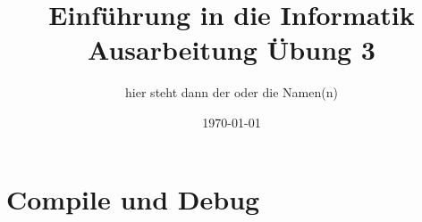 \documentclass[a4paper,11pt,titlepage]{article}
\begin{document}
\title{Einf\"uhrung in die Informatik\\
Ausarbeitung \"Ubung 3}


\author{hier steht dann der oder die Namen(n)}


\date{\today}

\maketitle{\thispagestyle{plain}}

\section{Compile und Debug}
\end{document}
